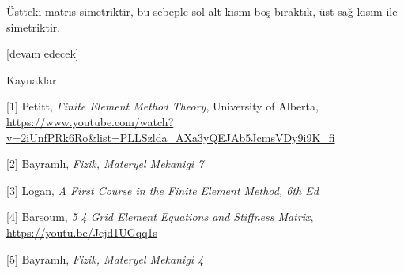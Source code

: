 \documentclass[12pt,fleqn]{article}\usepackage{../../common}
\begin{document}
Üstteki matris simetriktir, bu sebeple sol alt kısmı boş bıraktık, üst sağ
kısım ile simetriktir. 


[devam edecek]

Kaynaklar

[1] Petitt, {\em Finite Element Method Theory}, University of Alberta,
    \url{https://www.youtube.com/watch?v=2iUnfPRk6Ro&list=PLLSzlda_AXa3yQEJAb5JcmsVDy9i9K_fi}

[2] Bayramlı, {\em Fizik, Materyel Mekanigi 7}

[3] Logan, {\em A First Course in the Finite Element Method, 6th Ed}

[4] Barsoum, {\em 5 4 Grid Element Equations and Stiffness Matrix},
    \url{https://youtu.be/Jejd1UGqq1s}

[5] Bayramlı, {\em Fizik, Materyel Mekanigi 4}
\end{document}
